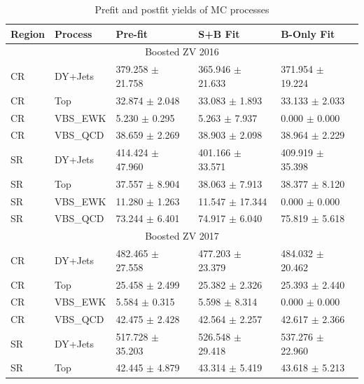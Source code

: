 \begin{table}
  \centering
  \caption{Prefit and postfit yields of MC processes}
  \begin{tabular}{lllll}
    \toprule
    Region & Process  & Pre-fit                  & S+B Fit                  & B-Only Fit               \\
    \midrule
    \multicolumn{5}{c}{Boosted ZV 2016}                                                                \\
    \midrule
    CR     & DY+Jets  & 379.258 \( \pm \) 21.758 & 365.946 \( \pm \) 21.633 & 371.954 \( \pm \) 19.224 \\
    CR     & Top      & 32.874 \( \pm \) 2.048   & 33.083 \( \pm \) 1.893   & 33.133 \( \pm \) 2.033   \\
    CR     & VBS\_EWK & 5.230 \( \pm \) 0.295    & 5.263 \( \pm \) 7.937    & 0.000 \( \pm \) 0.000    \\
    CR     & VBS\_QCD & 38.659 \( \pm \) 2.269   & 38.903 \( \pm \) 2.098   & 38.964 \( \pm \) 2.229   \\
    SR     & DY+Jets  & 414.424 \( \pm \) 47.960 & 401.166 \( \pm \) 33.571 & 409.919 \( \pm \) 35.398 \\
    SR     & Top      & 37.557 \( \pm \) 8.904   & 38.063 \( \pm \) 7.913   & 38.377 \( \pm \) 8.120   \\
    SR     & VBS\_EWK & 11.280 \( \pm \) 1.263   & 11.547 \( \pm \) 17.344  & 0.000 \( \pm \) 0.000    \\
    SR     & VBS\_QCD & 73.244 \( \pm \) 6.401   & 74.917 \( \pm \) 6.040   & 75.819 \( \pm \) 5.618   \\
    \midrule
    \multicolumn{5}{c}{Boosted ZV 2017}                                                                \\
    \midrule
    CR     & DY+Jets  & 482.465 \( \pm \) 27.558 & 477.203 \( \pm \) 23.379 & 484.032 \( \pm \) 20.462 \\
    CR     & Top      & 25.458 \( \pm \) 2.499   & 25.382 \( \pm \) 2.326   & 25.393 \( \pm \) 2.440   \\
    CR     & VBS\_EWK & 5.584 \( \pm \) 0.315    & 5.598 \( \pm \) 8.314    & 0.000 \( \pm \) 0.000    \\
    CR     & VBS\_QCD & 42.475 \( \pm \) 2.428   & 42.564 \( \pm \) 2.257   & 42.617 \( \pm \) 2.366   \\
    SR     & DY+Jets  & 517.728 \( \pm \) 35.203 & 526.548 \( \pm \) 29.418 & 537.276 \( \pm \) 22.960 \\
    SR     & Top      & 42.445 \( \pm \) 4.879   & 43.314 \( \pm \) 5.419   & 43.618 \( \pm \) 5.213   \\

\end{tabular}
\end{table}
